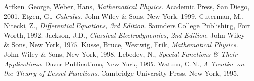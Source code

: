 \documentclass[12pt]{article}
\begin{document}
\begin{thebibliography}{9}
 Arfken, George, Weber, Hans, {\em Mathematical Physics}. Academic Press, San Diego, 2001.
 Etgen, G., {\em Calculus}. John Wiley \& Sons, New York, 1999.
 Guterman, M., Nitecki, Z., {\em Differential Equations, 3rd Edition}. Saunders College Publishing, Fort Worth, 1992.
 Jackson, J.D., {\em Classical Electrodynamics, 2nd Edition}. John Wiley \& Sons, New York, 1975.
 Kusse, Bruce, Westwig, Erik, {\em Mathematical Physics}. John Wiley \& Sons, New York, 1998.
 Lebedev, N., {\em Special Functions \& Their Applications}. Dover Publications, New York, 1995.
 Watson, G.N., {\em A Treatise on the Theory of Bessel Functions}. Cambridge University Press, New York, 1995.
\end{thebibliography}

\end{document}
